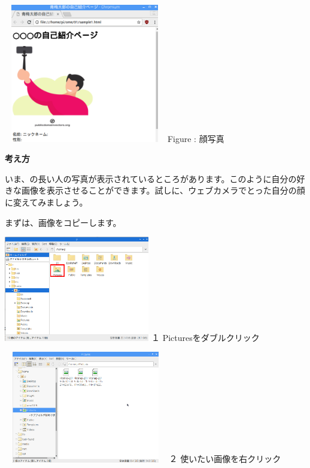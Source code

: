 \documentclass[a4paper,12pt]{jarticle}
\begin{document}
\centering
\begin{minipage}{6.738cm}
  {\upshape
    \includegraphics[width=7.071cm,height=6.048cm]{textbook-img161.png}
    \newline
    Figure : 顔写真}
\end{minipage}

\flushleft
\textbf{考え方}


いま、の長い人の写真が表示されているところがあります。このように自分の好きな画像を表示させることができます。試しに、ウェブカメラでとった自分の顔に変えてみましょう。

まずは、画像をコピーします。


\bigskip

\begin{minipage}{6.377cm}
  \includegraphics[width=6.359cm,height=4.597cm]{textbook-img164.png}
  \newline
  １ Picturesをダブルクリック
\end{minipage}
\hspace{10mm}
\begin{minipage}{7.465cm}
  \includegraphics[width=7.142cm,height=4.873cm]{textbook-img162.png}
  \newline
  ２ 使いたい画像を右クリック
\end{minipage}
\end{document}
